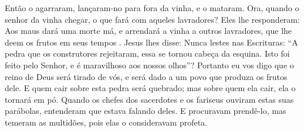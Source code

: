 {  Então o agarraram, lançaram-no para fora da vinha, e o mataram.
  Ora, quando o senhor da vinha chegar, o que fará com aqueles lavradores?
  Eles lhe responderam: Aos maus dará uma morte má, e arrendará a vinha a outros lavradores, que lhe deem os frutos em seus tempos
{} .
  Jesus lhes disse: Nunca lestes nas Escrituras: “A pedra que os construtores rejeitaram, essa se tornou cabeça da esquina. Isto foi feito pelo Senhor, e é maravilhoso aos nossos olhos”?
{}
  Portanto eu vos digo que o reino de Deus será tirado de vós, e será dado a um povo que produza os frutos dele.
  E quem cair sobre esta pedra será quebrado; mas sobre quem ela cair, ela o tornará em pó.
  Quando os chefes dos sacerdotes e os fariseus ouviram estas suas parábolas, entenderam que
{} estava falando deles.
  E procuravam prendê-lo, mas temeram as multidões, pois elas o consideravam profeta.
\par }

